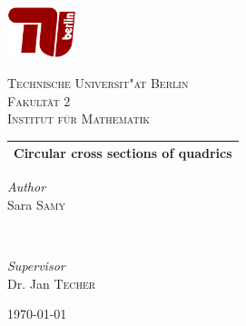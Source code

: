 \documentclass[10pt, a4paper]{article}
\theoremstyle{BoldTopSpacing}
\theoremstyle{BoldTopSpacing}
\theoremstyle{BoldTopSpacing}
\theoremstyle{BoldTopBottomSpacing}
\theoremstyle{BoldTopSpacing}
\theoremstyle{BoldTopBottomSpacing}
\theoremstyle{remark}
\begin{document}
\color{RichBlack}


\begin{titlepage}
\newcommand{\HRule}{\rule{\linewidth}{0.5mm}}
\begin{center}

\includegraphics[width=0.15\textwidth]{TU-Berlin-Logo.png}\\[1cm]
\begin{otherlanguage}{german}
\textsc{\LARGE Technische Universit"at Berlin}\\[1.5cm]
\textsc{\large Fakult\"at 2}\\[0.5cm]
\textsc{\large Institut f\"ur Mathematik}\\[0.5cm]
\end{otherlanguage}

\setlength{\aboverulesep}{10pt}
\setlength{\belowrulesep}{13pt}
\begin{tabularx}{\textwidth}{ >{\centering\arraybackslash}X}
\midrule[0.5mm]
\huge\bfseries Circular cross sections of quadrics\\
\midrule[0.5mm]
\end{tabularx}

\begin{minipage}{0.4\textwidth}
    \begin{flushleft}
        \large
        \textit{\textcolor{TUColor}{Author}}\\
        Sara \textsc{Samy}
    \end{flushleft}
\end{minipage}
~
\begin{minipage}{0.4\textwidth}
    \begin{flushright}
        \large
        \textit{\textcolor{TUColor}{Supervisor}}\\
        Dr. Jan \textsc{Techer}
    \end{flushright}
\end{minipage}

\vspace{260 pt}
{\large\today}
\end{center}
\end{titlepage}
\end{document}
